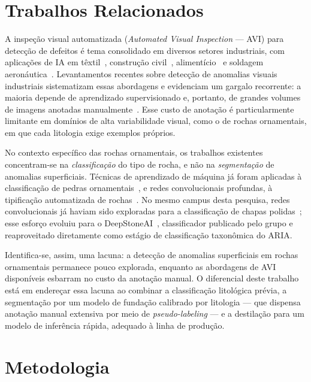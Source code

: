 \documentclass[12pt]{article}
\begin{document}
\section{Trabalhos Relacionados}
\label{sec:relacionados}

A inspeção visual automatizada (\textit{Automated Visual Inspection} --- AVI) para detecção de defeitos é tema consolidado em diversos setores industriais, com aplicações de IA em têxtil~\cite{avi_textile_sikka2024}, construção civil~\cite{avi_concrete_waqar2024}, alimentício~\cite{avi_food_chen2021} e soldagem aeronáutica~\cite{avi_welding_tsuzuki2022}. Levantamentos recentes sobre detecção de anomalias visuais industriais sistematizam essas abordagens e evidenciam um gargalo recorrente: a maioria depende de aprendizado supervisionado e, portanto, de grandes volumes de imagens anotadas manualmente~\cite{avi_anomaly_li2025}. Esse custo de anotação é particularmente limitante em domínios de alta variabilidade visual, como o de rochas ornamentais, em que cada litologia exige exemplos próprios.

No contexto específico das rochas ornamentais, os trabalhos existentes concentram-se na \textit{classificação} do tipo de rocha, e não na \textit{segmentação} de anomalias superficiais. Técnicas de aprendizado de máquina já foram aplicadas à classificação de pedras ornamentais~\cite{stone_lopez2010, stone_tereso2020}, e redes convolucionais profundas, à tipificação automatizada de rochas~\cite{rocktyping_baraboshkin2020}. No mesmo campus desta pesquisa, redes convolucionais já haviam sido exploradas para a classificação de chapas polidas~\cite{deepstone_araujo2022}; esse esforço evoluiu para o DeepStoneAI~\cite{deepstoneai_moreira2025}, classificador publicado pelo grupo e reaproveitado diretamente como estágio de classificação taxonômica do ARIA.

Identifica-se, assim, uma lacuna: a detecção de anomalias superficiais em rochas ornamentais permanece pouco explorada, enquanto as abordagens de AVI disponíveis esbarram no custo da anotação manual. O diferencial deste trabalho está em endereçar essa lacuna ao combinar a classificação litológica prévia, a segmentação por um modelo de fundação calibrado por litologia --- que dispensa anotação manual extensiva por meio de \textit{pseudo-labeling} --- e a destilação para um modelo de inferência rápida, adequado à linha de produção.

\section{Metodologia}
\label{sec:metodologia}
\end{document}
